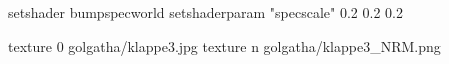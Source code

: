 setshader bumpspecworld
setshaderparam "specscale" 0.2 0.2 0.2

texture 0 golgatha/klappe3.jpg
texture n golgatha/klappe3_NRM.png
